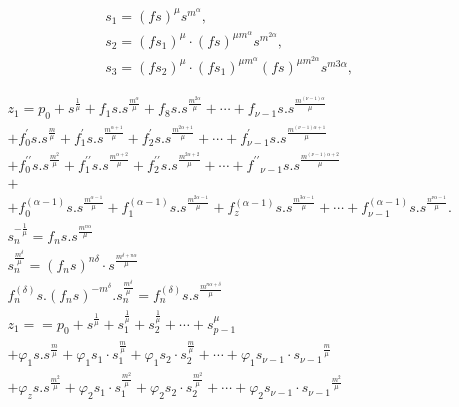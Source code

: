 \documentclass{article}
\begin{document}
\[
\begin{aligned}
& s_{1}=(f s)^{\mu} s^{m^{\alpha}}, \\
& s_{2}=\left(f s_{1}\right)^{\mu} \cdot(f s)^{\mu m^{\alpha}} s^{m^{2 \alpha}}, \\
& s_{3}=\left(f s_{2}\right)^{\mu} \cdot\left(f s_{1}\right)^{\mu m^{\alpha}}(f s)^{\mu m^{2 \alpha}} s^{m 3 \alpha},
\end{aligned}
\]


\[
\begin{aligned}
& z_{1}=p_{0}+s^{\frac{1}{\mu}}+f_{1} s . s^{\frac{m^{\alpha}}{\mu}}+f_{8} s . s^{\frac{m^{2 \alpha}}{\mu}}+\cdots+f_{\nu-1} s . s^{\frac{m^{(\nu-1) \alpha}}{\mu}} \\
& +f_{0}^{\prime} s . s^{\frac{m}{\mu}}+f_{1}^{\prime} s . s^{\frac{m^{\alpha+1}}{\mu}}+f_{2}^{\prime} s . s^{\frac{m^{2 \alpha+1}}{\mu}}+\cdots+f_{\nu-1}^{\prime} s . s^{\frac{m^{(\nu-1) \alpha+1}}{\mu}} \\
& +f_{0}^{\prime \prime} s . s^{\frac{m^{2}}{\mu}}+f_{1}^{\prime \prime} s . s^{\frac{m^{\alpha+2}}{\mu}}+f_{2}^{\prime \prime} s . s^{\frac{m^{2 \alpha+2}}{\mu}}+\cdots+f^{\prime \prime}{ }_{\nu-1} s . s^{\frac{m^{(\nu-1) \alpha+2}}{\mu}} \\
& + \\
& +f_{0}^{(\alpha-1)} s . s^{\frac{m^{\alpha-1}}{\mu}}+f_{1}^{(\alpha-1)} s . s^{\frac{m^{2 \alpha-1}}{\mu}}+f_{z}^{(\alpha-1)} s . s^{\frac{m^{3 \alpha-1}}{\mu}}+\cdots+f_{\nu-1}^{(\alpha-1)} s . s^{\frac{n^{\nu \alpha-1}}{\mu}} . \\
& s_{n}^{-\frac{1}{\mu}}=f_{n} s . s^{\frac{m^{n \alpha}}{\mu}} \\
& s_{n}^{\frac{m^{\delta}}{\mu}}=\left(f_{n} s\right)^{n \delta} \cdot s^{\frac{m^{\delta+n \alpha}}{\mu}} \\
& f_{n}^{(\delta)} s .\left(f_{n} s\right)^{-m^{\delta}} . s_{n}^{\frac{m^{\delta}}{\mu}}=f_{n}^{(\delta)} s . s^{\frac{m^{n \alpha+\delta}}{\mu}} \\
& z_{1}==p_{0}+s^{\frac{1}{\mu}}+s_{1}^{\frac{1}{\mu}}+s_{2}^{\frac{1}{\mu}}+\cdots+s_{p-1}^{\mu} \\
& +\varphi_{1} s . s^{\frac{m}{\mu}}+\varphi_{1} s_{1} \cdot s_{1}^{\frac{m}{\mu}}+\varphi_{1} s_{2} \cdot s_{2}^{\frac{m}{\mu}}+\cdots+\varphi_{1} s_{\nu-1} \cdot s_{\nu-1}{ }^{\frac{m}{\mu}} \\
& +\varphi_{z} s . s^{\frac{m^{2}}{\mu}}+\varphi_{2} s_{1} \cdot s_{1}^{\frac{m^{2}}{\mu}}+\varphi_{2} s_{2} \cdot s_{2}^{\frac{m^{2}}{\mu}}+\cdots+\varphi_{2} s_{\nu-1} \cdot s_{\nu-1}{ }^{\frac{m^{2}}{\mu}} \\

\end{aligned}\]
\end{document}
